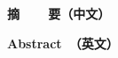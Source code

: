 \cleardoublepage{}

\vspace*{-2em}

\begin{center}
    \bfseries {} 摘~~~~要（中文）
\end{center}


\cleardoublepage{}

\vspace*{-2em}

\begin{center}
    \bfseries {} Abstract~（英文）
\end{center}
